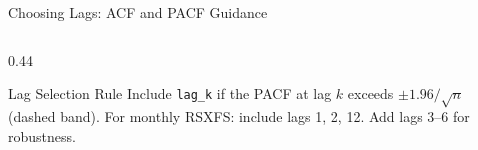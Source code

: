\documentclass[aspectratio=169, 10pt]{beamer}
\begin{document}
\begin{frame}{Choosing Lags: ACF and PACF Guidance}
\begin{columns}[T]
\begin{column}{0.44\textwidth}
      \begin{definitionbox}{Lag Selection Rule}
        \footnotesize
        Include \texttt{lag\_k} if the PACF at lag $k$
        exceeds $\pm 1.96/\sqrt{n}$ (dashed band).
        For monthly RSXFS: include lags 1, 2, 12.
        Add lags 3--6 for robustness.
      \end{definitionbox}

      \smallskip
    \end{column}
  \end{columns}
\end{frame}
\end{document}
